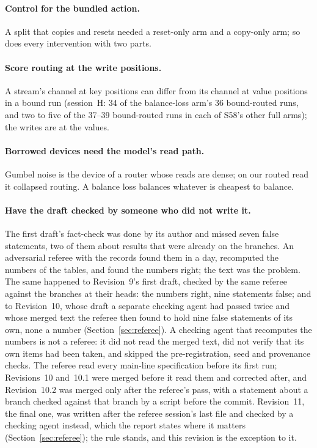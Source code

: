 \documentclass[11pt]{article}
\begin{document}
\paragraph{Control for the bundled action.} A split that copies and resets needed a reset-only arm and a copy-only arm; so does every intervention with two parts.

\paragraph{Score routing at the write positions.} A stream's channel at key positions can differ from its channel at value positions in a bound run (session~H: 34 of the balance-loss arm's 36 bound-routed runs, and two to five of the 37--39 bound-routed runs in each of S58's other full arms); the writes are at the values.

\paragraph{Borrowed devices need the model's read path.} Gumbel noise is the device of a router whose reads are dense; on our routed read it collapsed routing. A balance loss balances whatever is cheapest to balance.

\paragraph{Have the draft checked by someone who did not write it.} The first draft's fact-check was done by its author and missed seven false statements, two of them about results that were already on the branches. An adversarial referee with the records found them in a day, recomputed the numbers of the tables, and found the numbers right; the text was the problem. The same happened to Revision~9's first draft, checked by the same referee against the branches at their heads: the numbers right, nine statements false; and to Revision~10, whose draft a separate checking agent had passed twice and whose merged text the referee then found to hold nine false statements of its own, none a number (Section~\ref{sec:referee}). A checking agent that recomputes the numbers is not a referee: it did not read the merged text, did not verify that its own items had been taken, and skipped the pre-registration, seed and provenance checks. The referee read every main-line specification before its first run; Revisions~10 and~10.1 were merged before it read them and corrected after, and Revision~10.2 was merged only after the referee's pass, with a statement about a branch checked against that branch by a script before the commit. Revision~11, the final one, was written after the referee session's last file and checked by a checking agent instead, which the report states where it matters (Section~\ref{sec:referee}); the rule stands, and this revision is the exception to it.
\end{document}

